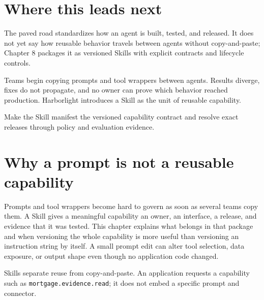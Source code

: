 \section{Where this leads next}

The paved road standardizes how an agent is built, tested, and released. It does not yet say how reusable behavior travels between agents without copy-and-paste; Chapter 8 packages it as versioned Skills with explicit contracts and lifecycle controls.\par



\begin{bookcallout}
Teams begin copying prompts and tool wrappers between agents. Results diverge, fixes do not propagate, and no owner can prove which behavior reached production. Harborlight introduces a Skill as the unit of reusable capability.
\end{bookcallout}

\begin{bookcallout}
Make the Skill manifest the versioned capability contract and resolve exact releases through policy and evaluation evidence.
\end{bookcallout}

\section{Why a prompt is not a reusable capability}

Prompts and tool wrappers become hard to govern as soon as several teams copy them. A Skill gives a meaningful capability an owner, an interface, a release, and evidence that it was tested. This chapter explains what belongs in that package and when versioning the whole capability is more useful than versioning an instruction string by itself. A small prompt edit can alter tool selection, data exposure, or output shape even though no application code changed.\par

Skills separate reuse from copy-and-paste. An application requests a capability such as \lstinline[style=bookinline]!mortgage.evidence.read!; it does not embed a specific prompt and connector.\par

